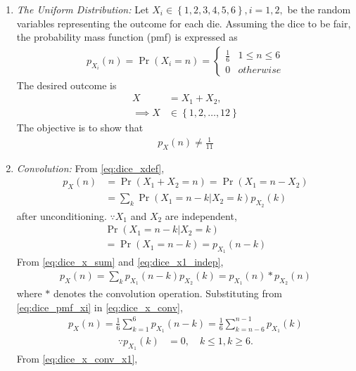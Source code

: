 \documentclass[journal,10pt,twocolumn]{IEEEtran}
\providecommand{\pr}[1]{\ensuremath{\Pr\left(#1\right)}}
\providecommand{\cbrak}[1]{\ensuremath{\left\{#1\right\}}}
\begin{document}
\begin{enumerate}
\item  {\em The Uniform Distribution: }Let $X_i \in \cbrak{1,2,3,4,5,6}, i = 1,2,$ be the random variables representing the outcome for each die.  Assuming the dice to be fair, the probability mass function (pmf) is expressed as 
\begin{align}
\label{eq:dice_pmf_xi}
p_{X_i}(n) = \pr{X_i = n} = 
\begin{cases}
\frac{1}{6} & 1 \le n \le 6
\\
0 & otherwise
\end{cases}
\end{align}
The desired outcome is
\begin{align}
\label{eq:dice_xdef}
X &= X_1 + X_2,
\\
\implies X &\in \cbrak{1,2,\dots,12}
\end{align}
%
The objective is to show that
\begin{align}
p_X(n) \ne \frac{1}{11}
\label{eq:dice_wrong}
\end{align}
\item {\em Convolution: }
From \eqref{eq:dice_xdef},
\begin{align}
p_X(n) &= \pr{X_1 + X_2 = n} = \pr{X_1  = n -X_2}
\\
&= \sum_{k}^{}\pr{X_1  = n -k | X_2 = k}p_{X_2}(k)
\label{eq:dice_x_sum}
\end{align}%
after unconditioning.  $\because X_1$ and $X_2$ are independent,
\begin{multline}
\pr{X_1  = n -k | X_2 = k} 
\\
= \pr{X_1  = n -k} = p_{X_1}(n-k)
\label{eq:dice_x1_indep}
\end{multline}
From \eqref{eq:dice_x_sum} and \eqref{eq:dice_x1_indep},
\begin{align}
p_X(n) = \sum_{k}^{}p_{X_1}(n-k)p_{X_2}(k) = p_{X_1}(n)*p_{X_2}(n)
\label{eq:dice_x_conv}
\end{align}
where $*$ denotes the convolution operation. 
Substituting from \eqref{eq:dice_pmf_xi}
in \eqref{eq:dice_x_conv},
\begin{align}
p_X(n) = \frac{1}{6}\sum_{k=1}^{6}p_{X_1}(n-k)= \frac{1}{6}\sum_{k=n-6}^{n-1}p_{X_1}(k)
\label{eq:dice_x_conv_x1}
\end{align}
\begin{align}
\because p_{X_1}(k) &= 0, \quad k \le 1, k \ge 6.
\end{align}
From \eqref{eq:dice_x_conv_x1},
%
\begin{align}

\end{align}
\end{enumerate}
\end{document}
